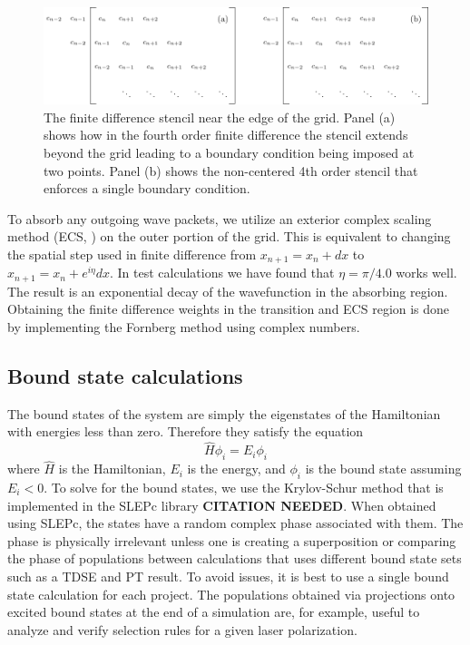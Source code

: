 \begin{figure}[t]
\centering
   
    \includegraphics[width=\linewidth]{figs/ghost_nodes.pdf}
   
\caption{The finite difference stencil near the edge of the grid. Panel (a) shows how in the fourth order finite difference the stencil extends beyond the grid leading to a boundary condition being imposed at two points. Panel (b) shows the non-centered 4th order stencil that enforces a single boundary condition.
} 
  \label{fig:ghost_nodes}
\end{figure}


To absorb any outgoing wave packets, we utilize an exterior complex scaling method (ECS, \cite{He_ECS_2007}) on the outer portion of the grid. This is equivalent to changing the spatial step used in finite difference from $x_{n+1} = x_n+dx$ to $x_{n+1} = x_n+e^{i\eta}dx$. In test calculations we have found that $\eta=\pi / 4.0$ works well. The result is an exponential decay of the wavefunction in the absorbing region. Obtaining the finite difference weights in the transition and ECS region is done by implementing the Fornberg method \cite{Fornberg1988} using complex numbers.


\subsection{Bound state calculations} %
\label{sub:bound_state_calculations}
The bound states of the system are simply the eigenstates of the Hamiltonian with energies less than zero. Therefore they satisfy the equation 
\begin{equation}
    \hat{H} \phi_i = E_i \phi_i
\end{equation}
where $\hat{H}$ is the Hamiltonian, $E_i$ is the energy, and $\phi_i$ is the bound state assuming $E_i < 0$. To solve for the bound states, we use the Krylov-Schur method that is implemented in the SLEPc library \textbf{CITATION NEEDED}. When obtained using SLEPc, the states have a random complex phase associated with them. The phase is physically irrelevant unless one is creating a superposition or comparing the phase of populations between calculations that uses different bound state sets such as a TDSE and PT result. To avoid issues, it is best to use a single bound state calculation for each project. The populations obtained via projections onto excited bound states at the end of a simulation are, for example, useful to analyze and verify selection rules for a given laser polarization.

